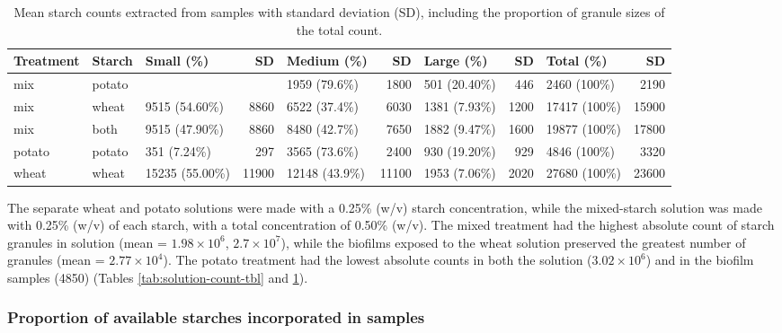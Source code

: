 \documentclass[
]{article}
\begin{document}
\begin{table}

\caption{\label{tab:sample-count-tbl}Mean starch counts extracted from samples with standard 
             deviation (SD), including the proportion of granule sizes of the total count.}
\centering
\begin{tabular}[t]{l|l|l|r|l|r|l|r|l|r}
\hline
Treatment & Starch & Small (\%) & SD & Medium (\%) & SD & Large (\%) & SD & Total (\%) & SD\\
\hline
mix & potato &  &  & 1959 (79.6\%) & 1800 & 501 (20.40\%) & 446 & 2460 (100\%) & 2190\\
\hline
mix & wheat & 9515 (54.60\%) & 8860 & 6522 (37.4\%) & 6030 & 1381 (7.93\%) & 1200 & 17417 (100\%) & 15900\\
\hline
mix & both & 9515 (47.90\%) & 8860 & 8480 (42.7\%) & 7650 & 1882 (9.47\%) & 1600 & 19877 (100\%) & 17800\\
\hline
potato & potato & 351 (7.24\%) & 297 & 3565 (73.6\%) & 2400 & 930 (19.20\%) & 929 & 4846 (100\%) & 3320\\
\hline
wheat & wheat & 15235 (55.00\%) & 11900 & 12148 (43.9\%) & 11100 & 1953 (7.06\%) & 2020 & 27680 (100\%) & 23600\\
\hline
\end{tabular}
\end{table}

The separate wheat and potato solutions were made with a 0.25\% (w/v) starch
concentration, while the mixed-starch solution was made with 0.25\% (w/v) of each
starch, with a total concentration of 0.50\% (w/v).
The mixed treatment had the highest absolute count of starch granules in solution (mean = \ensuremath{1.98\times 10^{6}}, \ensuremath{2.7\times 10^{7}}),
while the biofilms exposed to the wheat solution preserved the greatest number of
granules
(mean = \ensuremath{2.77\times 10^{4}}).
The potato treatment had the lowest absolute counts in both the solution
(\ensuremath{3.02\times 10^{6}})
and in the biofilm samples
(4850)
(Tables \ref{tab:solution-count-tbl} and \ref{tab:sample-count-tbl}).

\hypertarget{proportion-of-available-starches-incorporated-in-samples}{%
\subsubsection{Proportion of available starches incorporated in samples}\label{proportion-of-available-starches-incorporated-in-samples}}
\end{document}
